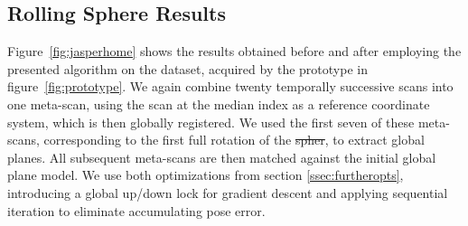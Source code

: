 \documentclass[5p]{elsarticle}
\providecommand{\DIFaddtex}[1]{{\protect\color{blue}\uwave{#1}}} %
\providecommand{\DIFdeltex}[1]{{\protect\color{red}\sout{#1}}}                      %
\providecommand{\DIFaddbegin}{} %
\providecommand{\DIFaddend}{} %
\providecommand{\DIFdelbegin}{} %
\providecommand{\DIFdelend}{} %
\providecommand{\DIFadd}[1]{\texorpdfstring{\DIFaddtex{#1}}{#1}} %
\providecommand{\DIFdel}[1]{\texorpdfstring{\DIFdeltex{#1}}{}} %
\begin{document}
\subsection{Rolling Sphere Results}

Figure~\ref{fig:jasperhome} shows the results obtained before and after employing the presented algorithm on the dataset, acquired by the prototype in figure~\ref{fig:prototype}.
We again combine twenty temporally successive scans into one meta-scan, using the scan at the median index as a reference coordinate system, which is then globally registered.
We used the first seven of these meta-scans, corresponding to the first full rotation of the \DIFdelbegin \DIFdel{spher}\DIFdelend \DIFaddbegin \DIFadd{sphere}\DIFaddend , to extract global planes.
All subsequent meta-scans are then matched against the initial global plane model.
We use both optimizations from section \ref{ssec:furtheropts}, introducing a global up/down lock for gradient descent and applying sequential iteration to eliminate accumulating pose error.
\end{document}
